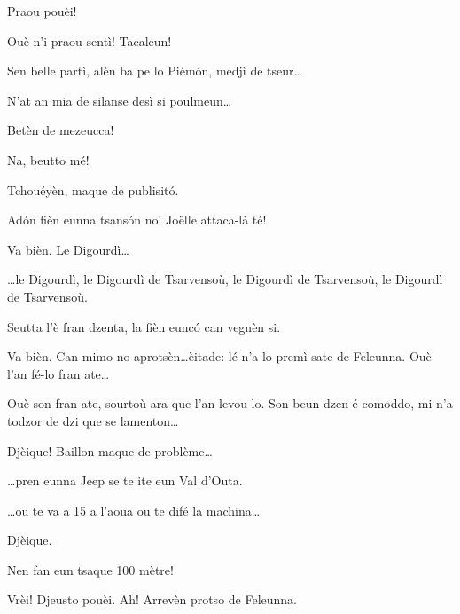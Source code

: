 \begin{drama}
\Jordyspeaks Praou pouèi!

\Chauffeurspeaks Ouè n'i praou sentì! Tacaleun!


\Joelspeaks Sen belle partì, alèn ba pe lo Piém\'on, medjì de tseur\ldots 


\Joelspeaks N'at an mia de silanse desì si poulmeun\ldots

\Thierryspeaks Betèn de mezeucca!


\Chauffeurspeaks Na, beutto mé!


\Chauffeurspeaks Tchouéyèn, maque de publisit\'o.

\Joelspeaks Ad\'on fièn eunna tsans\'on no! Jo\"{e}lle attaca-là té!

\Joellespeaks Va bièn.  Le Digourdì\ldots

\Tcheuttespeaks{} \ldots le Digourdì, le Digourdì de Tsarvensoù, le Digourdì de Tsarvensoù, le Digourdì de Tsarvensoù.

\Joelspeaks Seutta l'è fran dzenta, la fièn euncó can vegnèn si.

\Chauffeurspeaks Va bièn. Can mimo no aprotsèn\ldots èitade: lé n'a lo premì sate de Feleunna. Ouè l'an fé-lo fran ate\ldots


\Joelspeaks Ouè son fran ate, sourtoù ara que l'an levou-lo. Son beun dzen é comoddo, mi n'a todzor de dzi que se lamenton\ldots

\Chauffeurspeaks Djèique! Baillon maque de problème\ldots

\Joelspeaks{} \ldots pren eunna Jeep se te ite eun Val d'Outa.

\Chauffeurspeaks{} \ldots ou te va a 15 a l'aoua ou te difé la machina\ldots

\Joelspeaks Djèique.

\Chauffeurspeaks Nen fan eun tsaque 100 mètre!

\Joelspeaks Vrèi! Djeusto pouèi. Ah! Arrevèn protso de Feleunna.


\end{drama}
